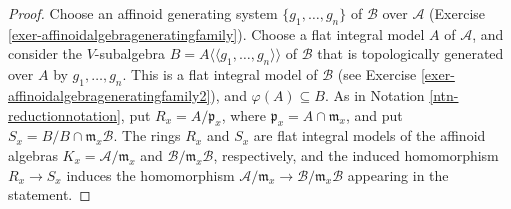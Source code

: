 \documentclass[a4paper,12pt, dvipdfmx]{jsbook}
\def\m{\mathfrak{m}}
\def\dl{\langle\!\langle}
\def\dr{\rangle\!\rangle}
\theoremstyle{plain}
\theoremstyle{definition}
\begin{document}
\begin{proof}[Proof]
Choose an affinoid generating system $\{g_1,\ldots,g_n\}$ of $\mathcal{B}$ over $\mathcal{A}$ (Exercise \ref{exer-affinoidalgebrageneratingfamily}).
Choose a flat integral model $A$ of $\mathcal{A}$, and consider the $V$-subalgebra $B=A\dl g_1,\ldots,g_n\dr$ of $\mathcal{B}$ that is topologically generated over $A$ by $g_1,\ldots,g_n$.
This is a flat integral model of $\mathcal{B}$ (see Exercise \ref{exer-affinoidalgebrageneratingfamily2}), and $\varphi(A)\subseteq B$.
As in Notation \ref{ntn-reductionnotation}, put $R_x=A/\mathfrak{p}_x$, where $\mathfrak{p}_x=A\cap\m_x$, and put $S_x=B/B\cap\m_x\mathcal{B}$.
The rings $R_x$ and $S_x$ are flat integral models of the affinoid algebras $K_x=\mathcal{A}/\m_x$ and $\mathcal{B}/\m_x\mathcal{B}$, respectively, and the induced homomorphism $R_x\rightarrow S_x$ induces the homomorphism $\mathcal{A}/\m_x\rightarrow\mathcal{B}/\m_x\mathcal{B}$ appearing in the statement.


\end{proof}
\end{document}
